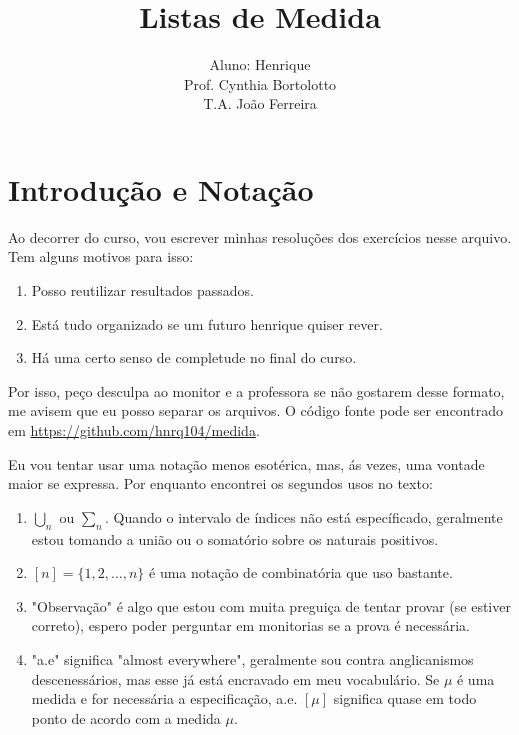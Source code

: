 \documentclass{article}
\author{
	Aluno: Henrique\\
	Prof. Cynthia Bortolotto\\
	T.A. João Ferreira
	}
\title{Listas de Medida}
\theoremstyle{definition}
\begin{document}
\maketitle

\tableofcontents
\setcounter{section}{-1}

\section{Introdução e Notação}
Ao decorrer do curso, vou escrever minhas resoluções dos exercícios nesse arquivo. Tem alguns motivos para isso:
\begin{enumerate}
	\item Posso reutilizar resultados passados.
	\item Está tudo organizado se um futuro henrique quiser rever.
	\item Há uma certo senso de completude no final do curso.
\end{enumerate}
Por isso, peço desculpa ao monitor e a professora se não gostarem desse formato, me avisem que eu posso separar os arquivos.
O código fonte pode ser encontrado em \url{https://github.com/hnrq104/medida}.

Eu vou tentar usar uma notação menos esotérica, mas, ás vezes, uma vontade maior se expressa. Por enquanto encontrei os segundos usos no texto:
\begin{enumerate}
	\item $\bigcup_n$ ou $\sum_n$. Quando o intervalo de índices não está específicado, geralmente estou tomando a união ou o somatório
	sobre os naturais positivos.
	\item $[n] = \{1,2,\dots, n\}$ é uma notação de combinatória que uso bastante.
	\item "Observação" é algo que estou com muita preguiça de tentar provar (se estiver correto), 
	espero poder perguntar em monitorias se a prova é necessária.
	\item "a.e" significa "almost everywhere", geralmente sou contra anglicanismos descenessários, mas
	esse já está encravado em meu vocabulário. Se $\mu$ é uma medida e for necessária a especificação,
	a.e. $[\mu]$ significa quase em todo ponto de acordo com a medida $\mu$.
\end{enumerate}















\end{document}
